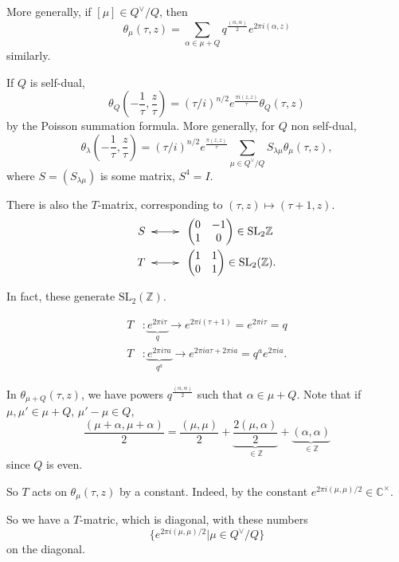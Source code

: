 More generally, if
$[\mu] \in Q^\vee/Q$, then
$$
\theta_\mu(\tau,z)=\sum_{\alpha \in \mu+Q}q^{\frac{(\alpha,\alpha)}{2}}
e^{2\pi i (\alpha,z)}
$$
similarly.

\medskip\noindent
If $Q$ is self-dual,
$$
\theta_Q\left(-\frac{1}{\tau},\frac{z}{\tau}\right)
=(\tau/i)^{n/2}e^{\frac{\pi i (z,z)}{\tau}}
\theta_Q(\tau,z)
$$
by the Poisson summation formula.
More generally, for $Q$ non self-dual,
$$
\theta_\lambda\left(-\frac{1}{\tau},\frac{z}{\tau}\right)
=(\tau/i)^{n/2}e^{\frac{\pi(z,z)}{\tau}}
\sum_{\mu \in Q^\vee/Q}S_{\lambda\mu}\theta_\mu(\tau,z),
$$
where $S=(S_{\lambda\mu})$ is some matrix,
$S^4=I$.

\begin{remark}
\label{remark-t-matrix}
There is also the $T$-matrix, corresponding to
$(\tau,z)\mapsto (\tau+1,z)$.
\begin{align*}
S&\xymatrix{\ar@{<->}[r]&}
\begin{pmatrix}
0&-1\\ 
1&0
\end{pmatrix}\in \text{SL}_2\mathbb{Z}\\
T & \xymatrix{\ar@{<->}[r]&}
\begin{pmatrix}
1&1\\ 
0&1
\end{pmatrix}\in \text{SL}_2(\mathbb{Z}).
\end{align*}

\noindent
In fact, these generate $\text{SL}_2(\mathbb{Z})$.
\end{remark}

\begin{align*}
T&:\underbrace{e^{2\pi i \tau}}_{q}\to e^{2\pi i(\tau+1)}
=e^{2\pi i \tau}=q\\
T&:\underbrace{e^{2\pi i\tau a}}_{q^a}\to
e^{2\pi i a \tau+2\pi i a}=q^ae^{2\pi i a}.
\end{align*}

\medskip\noindent
In $\theta_{\mu+Q}(\tau,z)$,
we have powers $q^{\frac{(\alpha,\alpha)}{2}}$ such that $\alpha \in \mu+Q$.
Note that if $\mu,\mu' \in \mu+Q$, $\mu'-\mu \in Q$,
$$
\frac{(\mu+\alpha,\mu+\alpha)}{2}
=\frac{(\mu,\mu)}{2}
+\underbrace{\frac{2(\mu,\alpha)}{2}}_{\in \mathbb{Z}}
+\underbrace{(\alpha,\alpha)}_{\in \mathbb{Z}}
$$
since $Q$ is even.

So $T$ acts on $\theta_\mu(\tau,z)$
by a constant. Indeed, by the constant
$e^{2\pi i (\mu,\mu)/2} \in \mathbb{C}^\times$.

So we have a $T$-matric, which is diagonal, with these numbers
$$
\{e^{2\pi i (\mu,\mu)/2}|\mu \in Q^\vee/Q\}
$$
on the diagonal.

